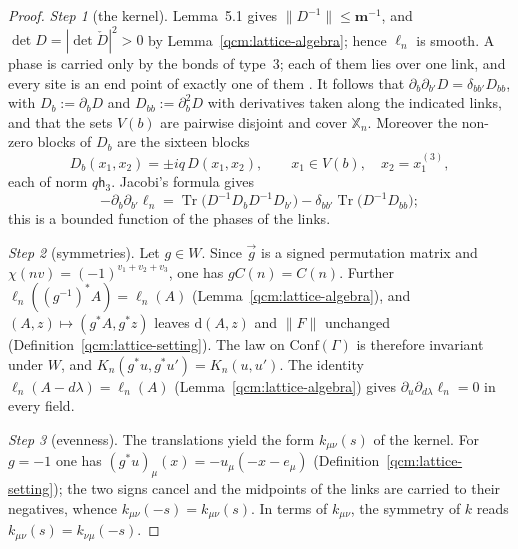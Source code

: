 \documentclass[11pt,letterpaper,reqno]{amsart}
\theoremstyle{definition}
\begin{document}
\begin{proof}
\emph{Step 1} (the kernel).
Lemma~5.1 gives $\|D^{-1}\|\le\mathbf m^{-1}$, and $\det D=|\det\check D|^2>0$ by Lemma~\ref{qcm:lattice-algebra}; hence $\ell_n$ is smooth.
A phase is carried only by the bonds of type~$3$; each of them lies over one link, and every site is an end point of exactly one of them \cite[Proposition~2.1]{QEDConstruction}.
It follows that $\partial_b\partial_{b'}D=\delta_{bb'}D_{bb}$, with $D_b:=\partial_bD$ and $D_{bb}:=\partial_b^2D$ with derivatives taken along the indicated links, and that the sets $V(b)$ are pairwise disjoint and cover $\mathbb X_n$.
Moreover the non-zero blocks of $D_b$ are the sixteen blocks
\begin{equation*}
D_b(x_1,x_2)=\pm iq\,D(x_1,x_2),\qquad x_1\in V(b),\quad x_2=x_1^{(3)},
\end{equation*}
each of norm $q\mathsf h_3$.
Jacobi's formula gives
\begin{equation*}
-\partial_b\partial_{b'}\ell_n=\operatorname{Tr}\bigl(D^{-1}D_bD^{-1}D_{b'}\bigr)-\delta_{bb'}\operatorname{Tr}\bigl(D^{-1}D_{bb}\bigr);
\end{equation*}
this is a bounded function of the phases of the links.

\emph{Step 2} (symmetries).
Let $g\in W$.
Since $\vec g$ is a signed permutation matrix and $\chi(nv)=(-1)^{v_1+v_2+v_3}$, one has $gC(n)=C(n)$.
Further $\ell_n((g^{-1})^*A)=\ell_n(A)$ (Lemma~\ref{qcm:lattice-algebra}), and $(A,z)\mapsto(g^*A,g^*z)$ leaves $\mathrm d(A,z)$ and $\|F\|$ unchanged (Definition~\ref{qcm:lattice-setting}).
The law on $\mathrm{Conf}(\Gamma)$ is therefore invariant under $W$, and $K_n(g^*u,g^*u')=K_n(u,u')$.
The identity $\ell_n(A-d\lambda)=\ell_n(A)$ (Lemma~\ref{qcm:lattice-algebra}) gives $\partial_u\partial_{d\lambda}\ell_n=0$ in every field.

\emph{Step 3} (evenness).
The translations yield the form $k_{\mu\nu}(s)$ of the kernel.
For $g=-1$ one has $(g^*u)_\mu(x)=-u_\mu(-x-e_\mu)$ (Definition~\ref{qcm:lattice-setting}); the two signs cancel and the midpoints of the links are carried to their negatives, whence $k_{\mu\nu}(-s)=k_{\mu\nu}(s)$.
In terms of $k_{\mu\nu}$, the symmetry of $k$ reads $k_{\mu\nu}(s)=k_{\nu\mu}(-s)$.


\end{proof}
\end{document}
